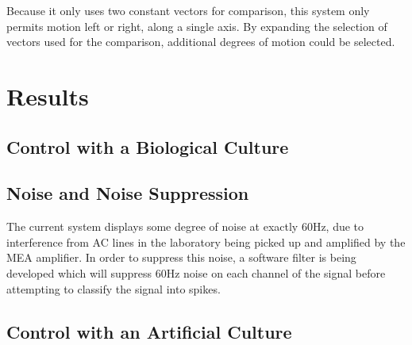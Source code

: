 \documentclass[letterpaper]{article}
\begin{document}
Because it only uses two constant vectors for comparison, this system only permits motion left or right, along a single axis. 
By expanding the selection of vectors used for the comparison, additional degrees of motion could be selected. 

\section{Results}

\subsection{Control with a Biological Culture} 

\subsection{Noise and Noise Suppression}

The current system displays some degree of noise at exactly 60Hz, due to interference from AC lines in the laboratory being picked up and amplified by the MEA amplifier. 
In order to suppress this noise, a software filter is being developed which will suppress 60Hz noise on each channel of the signal before attempting to classify the signal into spikes. 

\subsection{Control with an Artificial Culture}
\end{document}
